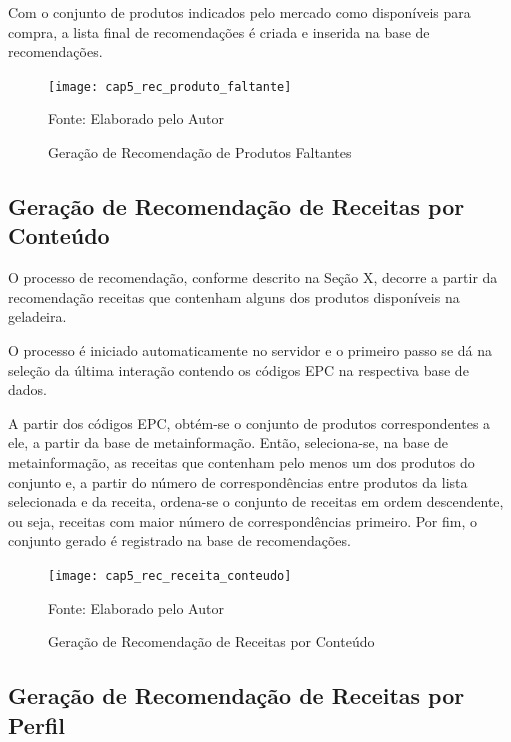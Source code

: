 Com o conjunto de produtos indicados pelo mercado como disponíveis para compra, a lista final de recomendações é criada e inserida na base de recomendações.

\begin{figure}[H]
    \caption{Geração de Recomendação de Produtos Faltantes} 
    \label{fig:cap5_rec_produto_faltante}
    \texttt{[image: cap5\_rec\_produto\_faltante]}
    
    \footnotesize{Fonte: Elaborado pelo Autor}
\end{figure}

\subsection{Geração de Recomendação de Receitas por Conteúdo}

O processo de recomendação, conforme descrito na Seção X, decorre a partir da recomendação receitas que contenham alguns dos produtos disponíveis na geladeira. 

O processo é iniciado automaticamente no servidor e o primeiro passo se dá na seleção da última interação contendo os códigos EPC na respectiva base de dados.

A partir dos códigos EPC, obtém-se o conjunto de produtos correspondentes a ele, a partir da base de metainformação. Então, seleciona-se, na base de metainformação, as receitas que contenham pelo menos um dos produtos do conjunto e, a partir do número de correspondências entre produtos da lista selecionada e da receita, ordena-se o conjunto de receitas em ordem descendente, ou seja, receitas com maior número de correspondências primeiro. Por fim, o conjunto gerado é registrado na base de recomendações.

\begin{figure}[htb]
    \caption{Geração de Recomendação de Receitas por Conteúdo} 
    \label{fig:cap5_rec_receita_conteudo}
    \texttt{[image: cap5\_rec\_receita\_conteudo]}
    
    \footnotesize{Fonte: Elaborado pelo Autor}
\end{figure}

\subsection{Geração de Recomendação de Receitas por Perfil}

